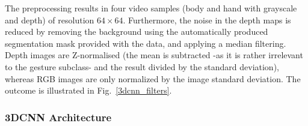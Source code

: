 The preprocessing results in four video samples (body and hand with grayscale and depth) of resolution $64\times64$.
Furthermore, the noise in the depth maps is reduced by removing the background using the automatically produced
segmentation mask provided with the data, and applying a  median filtering.
%
Depth images are Z-normalised (the mean is subtracted -as it is rather irrelevant to the gesture subclass-
and the result divided by the standard deviation), whereas
RGB images are only normalized by the image standard deviation.
The outcome is illustrated in Fig.~\ref{3dcnn_filters}.


\subsubsection{3DCNN Architecture}
\label{sec:3dcnnArchitecture}

